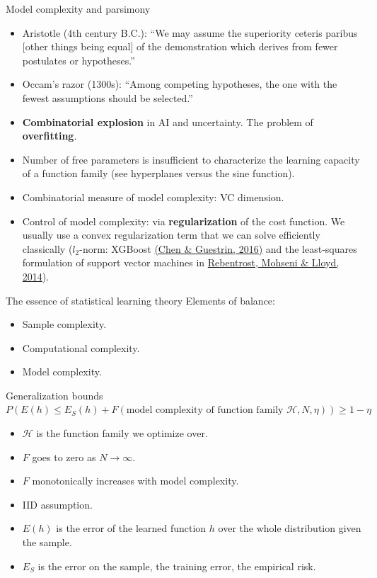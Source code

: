 \documentclass[compress]{beamer}\usetheme{Warsaw}\usecolortheme{crane}\useoutertheme[subsection=false]{smoothbars}
\begin{document}
\begin{frame}{Model complexity and parsimony}
\begin{itemize}
\item Aristotle (4th century B.C.): ``We may assume the superiority ceteris paribus [other things being equal] of the demonstration which derives from fewer postulates or hypotheses.''
\item Occam's razor (1300s): ``Among competing hypotheses, the one with the fewest assumptions should be selected.''
\item \textbf{Combinatorial explosion} in AI and uncertainty. The problem of \textbf{overfitting}.
\item Number of free parameters is insufficient to characterize the learning capacity of a function family (see hyperplanes versus the sine function).
\item Combinatorial measure of model complexity: VC dimension.
\item Control of model complexity: via \textbf{regularization} of the cost function. We usually use a convex regularization term that we can solve efficiently classically ($l_2$-norm: XGBoost \href{https://arxiv.org/abs/1603.02754}{(Chen \& Guestrin, 2016)} and the least-squares formulation of support vector machines in \href{https://arxiv.org/abs/1307.0471}{Rebentrost, Mohseni \& Lloyd, 2014}).
\end{itemize}
\end{frame}

\begin{frame}{The essence of statistical learning theory}
Elements of balance:
\begin{itemize}
 \item Sample complexity.
 \item Computational complexity.
 \item Model complexity.
\end{itemize}
\begin{block}{Generalization bounds}
\footnotesize{
$P\left(E(h) \leq E_S(h) + F(\textrm{model complexity of function family }\mathcal{H}, N, \eta)\right)\geq 1-\eta$}
\end{block}
\begin{itemize}
  \item $\mathcal{H}$ is the function family we optimize over.
  \item $F$ goes to zero as $N\rightarrow\infty$.
  \item $F$ monotonically increases with model complexity.
  \item IID assumption.
  \item $E(h)$ is the error of the learned function $h$ over the whole distribution given the sample.
  \item $E_S$ is the error on the sample, the training error, the empirical risk.
\end{itemize}
\end{frame}
\end{document}
